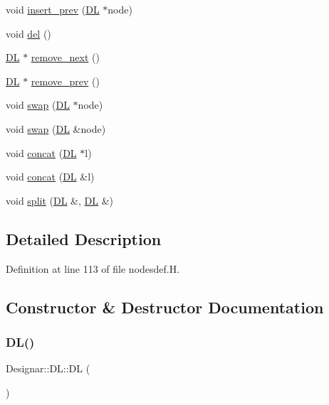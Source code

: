 \begin{DoxyCompactItemize}
\item 
void \hyperlink{class_designar_1_1_d_l_a44a3c60cd0f8de9811936cbe78d2e85e}{insert\+\_\+prev} (\hyperlink{class_designar_1_1_d_l}{DL} $\ast$node)
\item 
void \hyperlink{class_designar_1_1_d_l_affc0a48f00bd2ff8a6899c2a0c3d0ae3}{del} ()
\item 
\hyperlink{class_designar_1_1_d_l}{DL} $\ast$ \hyperlink{class_designar_1_1_d_l_a005d23127d2743fec552cafce79095d4}{remove\+\_\+next} ()
\item 
\hyperlink{class_designar_1_1_d_l}{DL} $\ast$ \hyperlink{class_designar_1_1_d_l_ab1978cfd1b4a98bedb0da473a7ba3164}{remove\+\_\+prev} ()
\item 
void \hyperlink{class_designar_1_1_d_l_a3a6b3f9fe3da01008ebf5f60bdf20bbc}{swap} (\hyperlink{class_designar_1_1_d_l}{DL} $\ast$node)
\item 
void \hyperlink{class_designar_1_1_d_l_a7b32539230a7ce8c23a8439bac4f3a12}{swap} (\hyperlink{class_designar_1_1_d_l}{DL} \&node)
\item 
void \hyperlink{class_designar_1_1_d_l_a016ee38fa1d6a467f07b3c8838e14937}{concat} (\hyperlink{class_designar_1_1_d_l}{DL} $\ast$l)
\item 
void \hyperlink{class_designar_1_1_d_l_ad952d602d2beded2a8f922289fe16d7f}{concat} (\hyperlink{class_designar_1_1_d_l}{DL} \&l)
\item 
void \hyperlink{class_designar_1_1_d_l_a81ed81ffd61fde1419fb4fb87ba551e3}{split} (\hyperlink{class_designar_1_1_d_l}{DL} \&, \hyperlink{class_designar_1_1_d_l}{DL} \&)
\end{DoxyCompactItemize}


\subsection{Detailed Description}


Definition at line 113 of file nodesdef.\+H.



\subsection{Constructor \& Destructor Documentation}
\mbox{\label{class_designar_1_1_d_l_a1e17a6036b4e5325d5aeb6641074ee14}} 
\subsubsection{\texorpdfstring{D\+L()}{DL()}\hspace{0.1cm}{\footnotesize\ttfamily [1/3]}}
{\footnotesize\ttfamily Designar\+::\+D\+L\+::\+DL (\begin{DoxyParamCaption}{ }\end{DoxyParamCaption})\hspace{0.3cm}{\ttfamily [inline]}}



